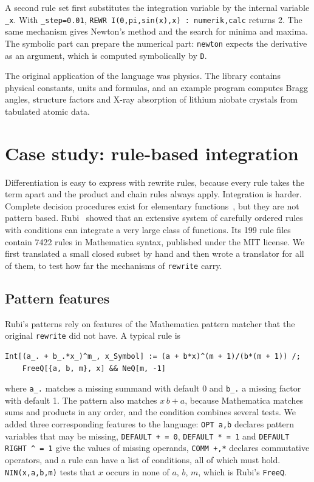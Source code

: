 \documentclass[11pt,a4paper]{article}
\begin{document}
A second rule set first substitutes the integration variable by the
internal variable \texttt{\_x}. With \texttt{\_step=0.01},
\texttt{REWR I(0,pi,sin(x),x) : numerik,calc} returns 2. The same
mechanism gives Newton's method and the search for minima and maxima. The
symbolic part can prepare the numerical part: \texttt{newton} expects the
derivative as an argument, which is computed symbolically by \texttt{D}.

The original application of the language was physics. The library contains
physical constants, units and formulas, and an example program computes
Bragg angles, structure factors and X-ray absorption of lithium niobate
crystals from tabulated atomic data.

\section{Case study: rule-based integration}

Differentiation is easy to express with rewrite rules, because every rule
takes the term apart and the product and chain rules always apply.
Integration is harder. Complete decision procedures exist for elementary
functions~\cite{risch1969problem,bronstein2005symbolic}, but they are not
pattern based. Rubi~\cite{rich2018rubi,rubirepo} showed that an extensive
system of carefully ordered rules with conditions can integrate a very
large class of functions. Its 199 rule files contain 7422 rules in
Mathematica syntax, published under the MIT license. We first translated a
small closed subset by hand and then wrote a translator for all of them, to
test how far the mechanisms of \texttt{rewrite} carry.

\subsection{Pattern features}

Rubi's patterns rely on features of the Mathematica pattern matcher that
the original \texttt{rewrite} did not have. A typical rule is

\begin{lstlisting}
Int[(a_. + b_.*x_)^m_, x_Symbol] := (a + b*x)^(m + 1)/(b*(m + 1)) /;
    FreeQ[{a, b, m}, x] && NeQ[m, -1]
\end{lstlisting}

where \texttt{a\_.} matches a missing summand with default 0 and
\texttt{b\_.} a missing factor with default 1. The pattern also matches
$x\,b + a$, because Mathematica matches sums and products in any order, and
the condition combines several tests. We added three corresponding
features to the language: \texttt{OPT a,b} declares pattern variables that may
be missing, \texttt{DEFAULT + = 0}, \texttt{DEFAULT * = 1} and
\texttt{DEFAULT RIGHT \^{} = 1} give the values of missing operands,
\texttt{COMM +,*} declares commutative operators, and a rule can have a list
of conditions, all of which must hold. \texttt{NIN(x,a,b,m)} tests that $x$
occurs in none of $a$, $b$, $m$, which is Rubi's \texttt{FreeQ}.
\end{document}
